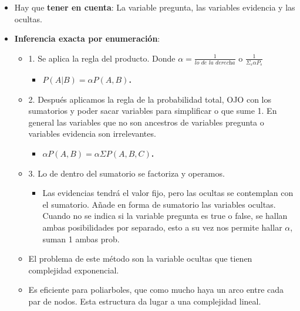 \documentclass[12pt, twoside, openright]{report} %
\begin{document}
  \begin{itemize}
  \item Hay que \textbf{tener en cuenta}: La variable pregunta, las
    variables evidencia y las ocultas.
    \pagebreak
  \item \textbf{Inferencia exacta por enumeración}:
    

    \begin{itemize}
    \item 1. Se aplica la regla del producto. Donde $\alpha=\frac{1}{\textit{lo de la derecha}}$ o
      $\frac{1}{\Sigma_s \alpha P_s} $
      

      \begin{itemize}
      \item \textbf{$P(A| B)=\alpha P(A, B)$.}
        
      \end{itemize}
    \item 2. Después aplicamos la regla de la probabilidad total, OJO con
      los sumatorios y poder sacar variables para simplificar o que sume
      1. En general las variables que no son ancestros de variables
      pregunta o variables evidencia son irrelevantes.
      

      \begin{itemize}
      \item \textbf{$\alpha P(A,B)=\alpha \Sigma P(A, B, C)$.}
        
      \end{itemize}
    \item 3. Lo de dentro del sumatorio se factoriza y operamos.
      

      \begin{itemize}
      \item Las evidencias tendrá el valor fijo, pero las ocultas se
        contemplan con el sumatorio. Añade en forma de sumatorio las
        variables ocultas. Cuando no se indica si la variable pregunta
        es true o false, se hallan ambas posibilidades por separado,
        esto a su vez nos permite hallar $\alpha$, suman 1 ambas prob.
        
      \end{itemize}
    \item El problema de este método son la variable ocultas que tienen
      complejidad exponencial.
      
    \item Es eficiente para poliarboles, que como mucho haya un arco entre
      cada par de nodos. Esta estructura da lugar a una complejidad
      lineal.
      

\end{itemize}
\end{itemize}
\end{document}
